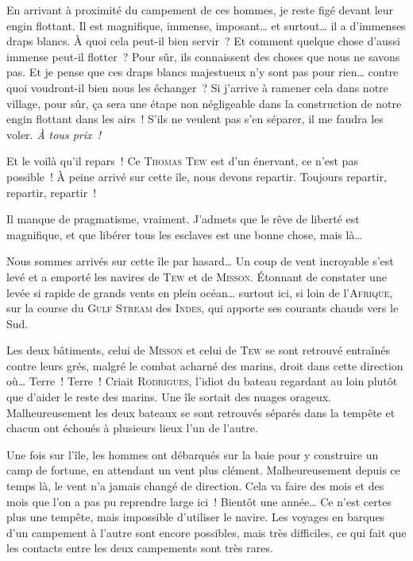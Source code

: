 {	En arrivant à proximité du campement de ces hommes, je reste figé devant leur engin flottant.
	Il est magnifique, immense, imposant… et surtout… il a d’immenses draps blancs.  À quoi cela peut-il bien servir~?
	Et comment quelque chose d’aussi immense peut-il flotter~?
	Pour sûr, ils connaissent des choses que nous ne savons pas.
	Et je pense que ces draps blancs majestueux n’y sont pas pour rien… contre quoi voudront-il bien nous les échanger~?
	Si j’arrive à ramener cela dans notre village, pour sûr, ça sera une étape non négligeable dans la construction de notre engin flottant dans les airs~!
	S’ils ne veulent pas s’en séparer, il me faudra les voler.  \emph{À tous prix~!}
}

{
	Et le voilà qu’il repars~!
	Ce \textsc{Thomas Tew} est d’un énervant, ce n’est pas possible~!
	À peine arrivé sur cette île, nous devons repartir.
	Toujours repartir, repartir, repartir~!

	Il manque de pragmatisme, vraiment.
	J’admets que le rêve de liberté est magnifique, et que libérer tous les esclaves est une bonne chose, mais là…

	Nous sommes arrivés sur cette île par hasard…  Un coup de vent incroyable s’est levé et a emporté les navires de \textsc{Tew} et de \textsc{Misson}.
	Étonnant de constater une levée si rapide de grands vents en plein océan… surtout ici, si loin de l’\textsc{Afrique}, sur la course du \textsc{Gulf Stream} des \textsc{Indes}, qui apporte ses courants chauds vers le Sud.

	Les deux bâtiments, celui de \textsc{Misson} et celui de \textsc{Tew} se sont retrouvé entraînés contre leurs grés, malgré le combat acharné des marins, droit dans cette direction où… Terre~!  Terre~!  Criait \textsc{Rodrigues}, l’idiot du bateau regardant au loin plutôt que d’aider le reste des marins.  Une île sortait des nuages orageux.
	Malheureusement les deux bateaux se sont retrouvés séparés dans la tempête et chacun ont échoués à plusieurs lieux l’un de l’autre.

	Une fois sur l’île, les hommes ont débarqués sur la baie pour y construire un camp de fortune, en attendant un vent plus clément.
	Malheureusement depuis ce temps là, le vent n’a jamais changé de direction.  Cela va faire des mois et des mois que l’on a pas pu reprendre large ici~!  Bientôt une année…  Ce n’est certes plus une tempête, mais impossible d’utiliser le navire.  Les voyages en barques d’un campement à l’autre sont encore possibles, mais très difficiles, ce qui fait que les contacts entre les deux campements sont très rares.

}

